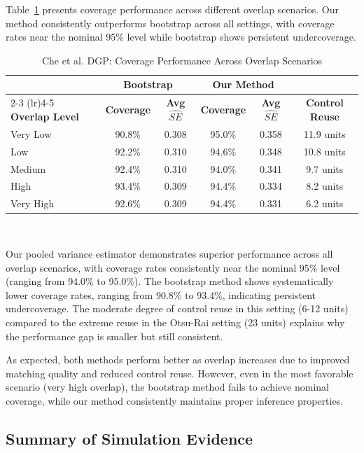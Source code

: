 \documentclass{mytemplate}
\begin{document}
Table~\ref{tab:che-validation} presents coverage performance across different overlap scenarios. Our method consistently outperforms bootstrap across all settings, with coverage rates near the nominal 95\% level while bootstrap shows persistent undercoverage.

\begin{table}[ht]
\centering
\caption{Che et al. DGP: Coverage Performance Across Overlap Scenarios}
\label{tab:che-validation}
\begin{tabular}{lccccc}
\toprule
& \multicolumn{2}{c}{\textbf{Bootstrap}} & \multicolumn{2}{c}{\textbf{Our Method}} & \\
\cmidrule(lr){2-3} \cmidrule(lr){4-5}
\textbf{Overlap Level} & \textbf{Coverage} & \textbf{Avg $\widehat{SE}$} & \textbf{Coverage} & \textbf{Avg $\widehat{SE}$} & \textbf{Control Reuse} \\
\midrule
Very Low & 90.8\% & 0.308 & 95.0\% & 0.358 & 11.9 units \\
Low & 92.2\% & 0.310 & 94.6\% & 0.348 & 10.8 units \\
Medium & 92.4\% & 0.310 & 94.0\% & 0.341 & 9.7 units \\
High & 93.4\% & 0.309 & 94.4\% & 0.334 & 8.2 units \\
Very High & 92.6\% & 0.309 & 94.4\% & 0.331 & 6.2 units \\
\bottomrule
\end{tabular}
\\[0.1cm]
\end{table}

Our pooled variance estimator demonstrates superior performance across all overlap scenarios, with coverage rates consistently near the nominal 95\% level (ranging from 94.0\% to 95.0\%). The bootstrap method shows systematically lower coverage rates, ranging from 90.8\% to 93.4\%, indicating persistent undercoverage. The moderate degree of control reuse in this setting (6-12 units) compared to the extreme reuse in the Otsu-Rai setting (23 units) explains why the performance gap is smaller but still consistent.

As expected, both methods perform better as overlap increases due to improved matching quality and reduced control reuse. However, even in the most favorable scenario (very high overlap), the bootstrap method fails to achieve nominal coverage, while our method consistently maintains proper inference properties.

\subsection{Summary of Simulation Evidence}
\end{document}
